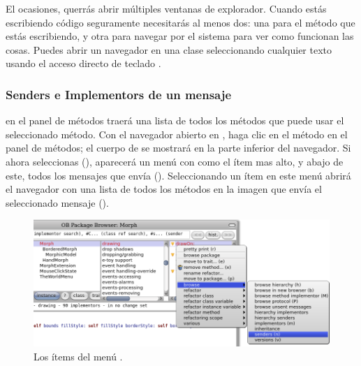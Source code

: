 \documentclass[spanish,a4paper,10pt,twoside]{book}
\begin{document}
El ocasiones, querr\'as abrir m\'ultiples ventanas de explorador.
Cuando est\'as escribiendo c\'odigo seguramente necesitar\'as al menos dos: una para el m\'etodo que est\'as escribiendo, y otra para navegar por el sistema para ver como funcionan las cosas.
Puedes abrir un navegador en una clase seleccionando cualquier texto usando el acceso directo de teclado .


\subsubsection{Senders e Implementors de un mensaje}

  en el panel de m\'etodos traer\'a una lista de todos los m\'etodos que puede usar el seleccionado m\'etodo. Con el navegador abierto en , haga clic en el m\'etodo  en el panel de m\'etodos; el cuerpo de  se mostrar\'a en la parte inferior del navegador. Si ahora seleccionas  (), aparecer\'a un men\'u con  como el \'item mas alto, y abajo de este, todos los mensajes que  env\'ia ().  Seleccionando un \'item en este men\'u abrir\'a el navegador con una lista de todos los m\'etodos en la imagen que env\'ia el seleccionado mensaje ().


\begin{figure}[htb]
\centerline {\includegraphics[width=\textwidth]{SendersOfDrawOn}}
\caption{Los \'items del men\'u  .}
\end{figure}
\end{document}

